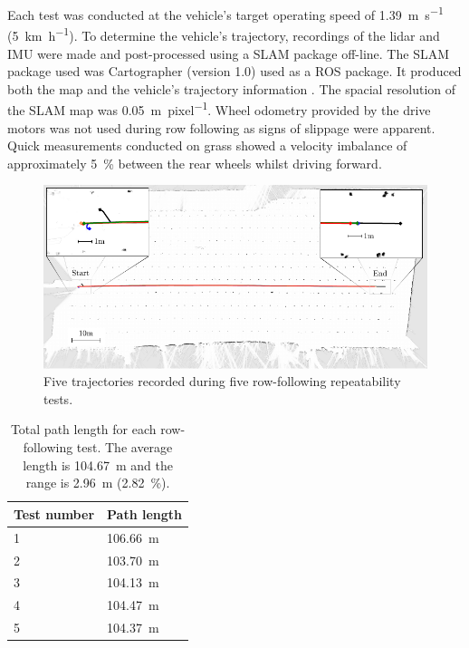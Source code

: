 \documentclass[preprint,authoryear,12pt]{elsarticle}
\begin{document}
    Each test was conducted at the vehicle's target operating speed of \SI{1.39}{\meter\per\second} (\SI{5}{\kilo\meter\per\hour}).
    To determine the vehicle's trajectory, recordings of the lidar and IMU were made and post-processed using a SLAM package off-line.
    The SLAM package used was Cartographer (version 1.0) used as a ROS package.
    It produced both the map and the vehicle's trajectory information \citep{Hess2016}.
    The spacial resolution of the SLAM map was \SI{0.05}{\meter\per pixel}.
    Wheel odometry provided by the drive motors was not used during row following as signs of slippage were apparent.
    Quick measurements conducted on grass showed a velocity imbalance of approximately \SI{5}{\percent} between the rear wheels whilst driving forward.

    \begin{figure}[htb]
        \centering
        \includegraphics[width=\linewidth]{imgs/slam/paths2.pdf}
        \caption{
            Five trajectories recorded during five row-following repeatability tests.
        }
        \label{fig:row_following_paths}
    \end{figure}

    \begin{table}[htbp]
      \centering
      \footnotesize
      \begin{tabular}{ l l}

          \textbf{Test number}      &\textbf{Path length} \\ \hline
          1 & \SI{106.66}{\meter}\\
          2 & \SI{103.70}{\meter}\\
          3 & \SI{104.13}{\meter}\\
          4 & \SI{104.47}{\meter}\\
          5 & \SI{104.37}{\meter}\\
      \end{tabular}
      \caption{Total path length for each row-following test. The average length is \SI{104.67}{\meter} and the range is \SI{2.96}{\meter} (\SI{2.82}{\percent}).}
      \label{table:row_follow_path_lenghts}
    \end{table}
\end{document}
